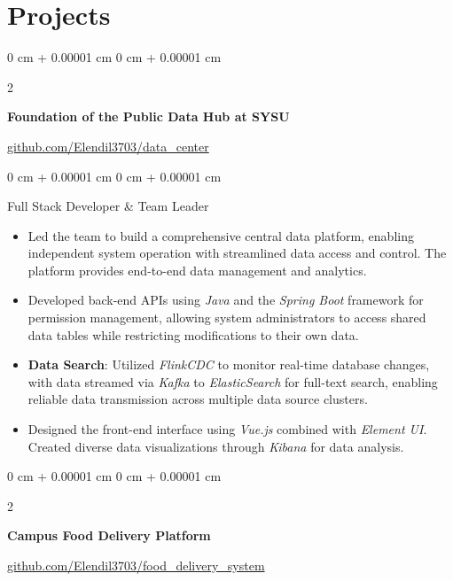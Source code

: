 \documentclass[10pt, letterpaper]{article}
\newenvironment{highlights}{
    \begin{itemize}[
        topsep=0.10 cm,
        parsep=0.10 cm,
        partopsep=0pt,
        itemsep=0pt,
        leftmargin=0 cm + 10pt
    ]
}{
    \end{itemize}
} %
\newenvironment{onecolentry}{
    \begin{adjustwidth}{
        0 cm + 0.00001 cm
    }{
        0 cm + 0.00001 cm
    }
}{
    \end{adjustwidth}
} %
\newenvironment{twocolentry}[2][]{
    \onecolentry
    \def\secondColumn{#2}
    \setcolumnwidth{\fill, 4.5 cm}
    \begin{paracol}{2}
}{
    \switchcolumn \raggedleft \secondColumn
    \end{paracol}
    \endonecolentry
} %
\begin{document}
        
\section{Projects}

        \begin{twocolentry}
    {\hspace{-5cm}\href{https://github.com/Elendil3703/data_center}{github.com/Elendil3703/data\_center}}
    \textbf{Foundation of the Public Data Hub at SYSU}
        \end{twocolentry}

        \begin{onecolentry}
        Full Stack Developer \& Team Leader
            \begin{highlights}
                
                \item Led the team to build a comprehensive central data platform, enabling independent system operation with streamlined data access and control. The platform provides end-to-end data management and analytics.
                
                \item Developed back-end APIs using \textit{Java} and the \textit{Spring Boot} framework for permission management, allowing system administrators to access shared data tables while restricting modifications to their own data. 
                
                \item \textbf{Data Search}: Utilized \textit{FlinkCDC} to monitor real-time database changes, with data streamed via \textit{Kafka} to \textit{ElasticSearch} for full-text search, enabling reliable data transmission across multiple data source clusters.

                \item Designed the front-end interface using \textit{Vue.js} combined with \textit{Element UI}. Created diverse data visualizations through \textit{Kibana} for data analysis.
                
            \end{highlights}
        \end{onecolentry}


        \vspace{0.2 cm}

        
        \begin{twocolentry}
    {\hspace{-5cm}\href{https://github.com/Elendil3703/food_delivery_system}{github.com/Elendil3703/food\_delivery\_system}}
    \textbf{Campus Food Delivery Platform}
        \end{twocolentry}
\end{document}
